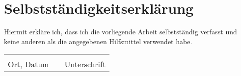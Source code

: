 \chapter*{Selbstständigkeitserklärung}

Hiermit erkläre ich, dass ich die vorliegende Arbeit selbstständig verfasst und keine anderen als die angegebenen Hilfsmittel verwendet habe.

\vspace{5\baselineskip}

\begin{tabular}{lp{2em}l}
\hspace{4cm} && \hspace{4cm} \\\cline{1-1}\cline{3-3}
Ort, Datum && Unterschrift
\end{tabular}